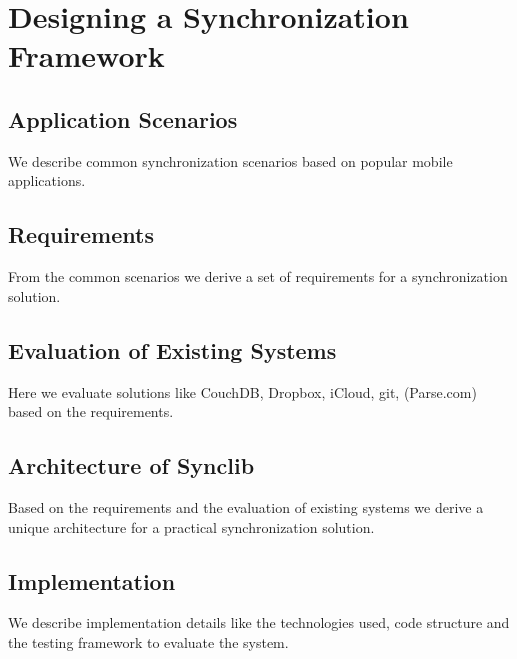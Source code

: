 
\chapter{Designing a Synchronization Framework}\label{main}

\section{Application Scenarios}
We describe common synchronization scenarios based on popular mobile applications.

\section{Requirements}
\label{sec:requirements}
From the common scenarios we derive a set of requirements for a synchronization solution.

\section{Evaluation of Existing Systems}
Here we evaluate solutions like CouchDB, Dropbox, iCloud, git, (Parse.com) based on the requirements.

\section{Architecture of Synclib}
Based on the requirements and the evaluation of existing systems we derive a unique architecture for a practical synchronization solution.

\section{Implementation}
We describe implementation details like the technologies used, code structure and the testing framework to evaluate the system.